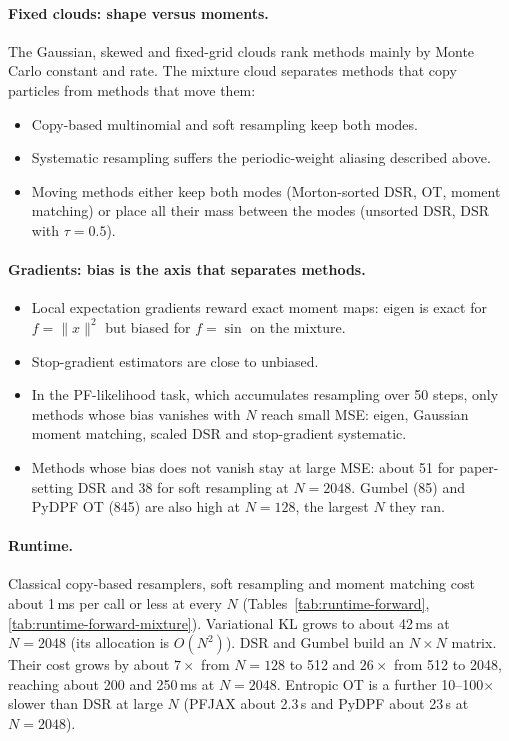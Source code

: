 \paragraph{Fixed clouds: shape versus moments.}
The Gaussian, skewed and fixed-grid clouds rank methods mainly by Monte Carlo constant and rate. The mixture cloud separates methods that copy particles from methods that move them:
\begin{itemize}
\item Copy-based multinomial and soft resampling keep both modes.
\item Systematic resampling suffers the periodic-weight aliasing described above.
\item Moving methods either keep both modes (Morton-sorted DSR, OT, moment matching) or place all their mass between the modes (unsorted DSR, DSR with $\tau{=}0.5$).
\end{itemize}

\paragraph{Gradients: bias is the axis that separates methods.}
\begin{itemize}
\item Local expectation gradients reward exact moment maps: eigen is exact for $f=\|x\|^2$ but biased for $f=\sin$ on the mixture.
\item Stop-gradient estimators are close to unbiased.
\item In the PF-likelihood task, which accumulates resampling over 50 steps, only methods whose bias vanishes with $N$ reach small MSE: eigen, Gaussian moment matching, scaled DSR and stop-gradient systematic.
\item Methods whose bias does not vanish stay at large MSE: about 51 for paper-setting DSR and 38 for soft resampling at $N{=}2048$. Gumbel (85) and PyDPF OT (845) are also high at $N{=}128$, the largest $N$ they ran.
\end{itemize}

\paragraph{Runtime.}
Classical copy-based resamplers, soft resampling and moment matching cost about 1\,ms per call or less at every $N$ (Tables~\ref{tab:runtime-forward}, \ref{tab:runtime-forward-mixture}). Variational KL grows to about 42\,ms at $N{=}2048$ (its allocation is $O(N^2)$). DSR and Gumbel build an $N\times N$ matrix. Their cost grows by about $7\times$ from $N{=}128$ to 512 and $26\times$ from 512 to 2048, reaching about 200 and 250\,ms at $N{=}2048$. Entropic OT is a further 10--100$\times$ slower than DSR at large $N$ (PFJAX about 2.3\,s and PyDPF about 23\,s at $N{=}2048$).

